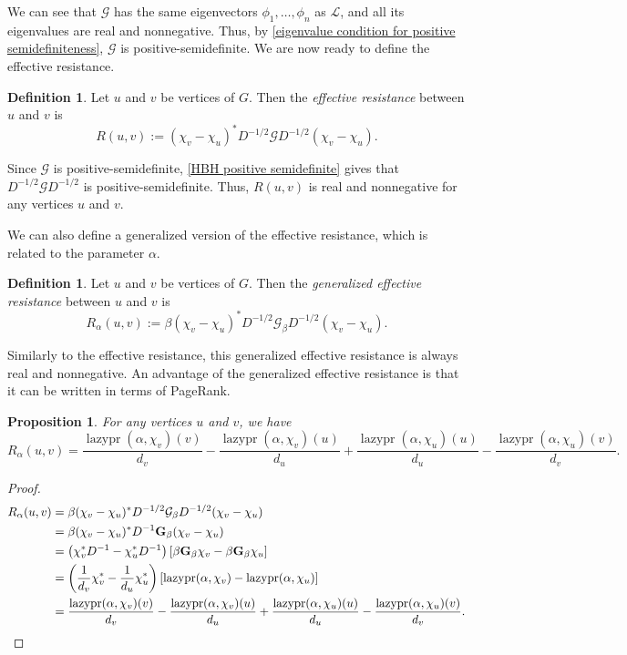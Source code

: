\documentclass[12pt]{article}
\newtheorem{prop}[thm]{Proposition}
\theoremstyle{definition}
\newtheorem{defn}[thm]{Definition}
\DeclareMathOperator{\lazypr}{lazypr}
\newcommand{\lap}{\mathcal{L}}
\newcommand{\green}{\mathcal{G}}
\newcommand{\asymgreen}{\normalfont{\textbf{G}}}
\begin{document}
We can see that $\green$ has the same eigenvectors $\phi_1, \dots, \phi_n$ as $\lap$, and all its eigenvalues are real and nonnegative. Thus, by \cref{eigenvalue condition for positive semidefiniteness}, $\green$ is positive-semidefinite. We are now ready to define the effective resistance.

\begin{defn}
Let $u$ and $v$ be vertices of $G$. Then the \textit{effective resistance} between $u$ and $v$ is 
$$
R(u, v) := (\chi_v - \chi_u)^* D^{-1/2} \green D^{-1/2} (\chi_v - \chi_u).
$$
\end{defn}

Since $\green$ is positive-semidefinite, \cref{HBH positive semidefinite} gives that $D^{-1/2} \green D^{-1/2}$ is positive-semidefinite. Thus, $R(u, v)$ is real and nonnegative for any vertices $u$ and $v$.

We can also define a generalized version of the effective resistance, which is related to the parameter $\alpha$.

\begin{defn}
Let $u$ and $v$ be vertices of $G$. Then the \textit{generalized effective resistance} between $u$ and $v$ is 
$$
R_\alpha(u, v) := \beta (\chi_v - \chi_u)^* D^{-1/2} \green_\beta D^{-1/2} (\chi_v - \chi_u).
$$
\end{defn}

Similarly to the effective resistance, this generalized effective resistance is always real and nonnegative. An advantage of the generalized effective resistance is that it can be written in terms of PageRank.

\begin{prop}
For any vertices $u$ and $v$, we have $$R_\alpha(u, v) = \frac{\lazypr(\alpha, \chi_v)(v)}{d_v} - \frac{\lazypr(\alpha, \chi_v)(u)}{d_u} + \frac{\lazypr(\alpha, \chi_u)(u)}{d_u} - \frac{\lazypr(\alpha, \chi_u)(v)}{d_v}.$$
\end{prop}
\begin{proof}
\begin{align*}
R_\alpha(u, v) &= \beta (\chi_v - \chi_u)^* D^{-1/2} \green_\beta D^{-1/2} (\chi_v - \chi_u) \\
&= \beta (\chi_v - \chi_u)^* D^{-1} \asymgreen_\beta (\chi_v - \chi_u) \\
&= \left( \chi_v^* D^{-1} - \chi_u^* D^{-1} \right) \left[ \beta \asymgreen_\beta \chi_v - \beta \asymgreen_\beta \chi_u \right] \\
&= \left( \frac{1}{d_v} \chi_v^* - \frac{1}{d_u} \chi_u^* \right) \left[ \lazypr(\alpha, \chi_v) - \lazypr(\alpha, \chi_u) \right] \\
&= \frac{\lazypr(\alpha, \chi_v)(v)}{d_v} - \frac{\lazypr(\alpha, \chi_v)(u)}{d_u} + \frac{\lazypr(\alpha, \chi_u)(u)}{d_u} - \frac{\lazypr(\alpha, \chi_u)(v)}{d_v}.
\end{align*}
\end{proof}
\end{document}
